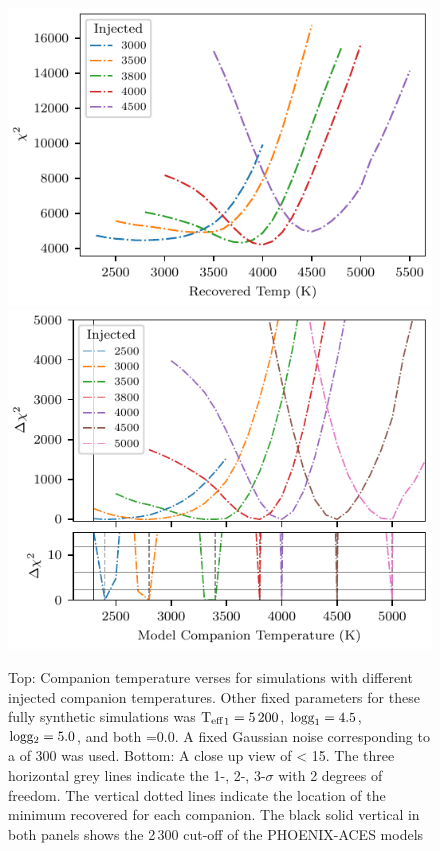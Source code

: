 \begin{figure}
    \centering
    \includegraphics[width=0.7\linewidth]{figures/companion_recovery/chi2_shape_investigation}
    \includegraphics[width=0.7\linewidth]{figures/companion_recovery/chi2_shape_investigation_with_delta}
    \caption{Top: Companion temperature verses \textchisquared{} for simulations with different injected companion temperatures.
    Other fixed parameters for these fully synthetic simulations was \({\textrm{T}_{\mathrm{eff}}}_{1}=5\,200\)\K{}, \(\textrm{logg}_1=4.5\), \(\textrm{logg}{}_2=5.0\), and both \feh{}=0.0.
    A fixed Gaussian noise corresponding to a \snr{} of 300 was used.
    Bottom: A close up view of \textchisquared{} < 15.
    The three horizontal grey lines indicate the 1-, 2-, 3-$\sigma$ with 2 degrees of freedom.
    The vertical dotted lines indicate the location of the minimum \textchisquared{} recovered for each companion.
    The black solid vertical in both panels shows the 2\,300\K{} cut-off of the {PHOENIX-ACES} models}
    \label{fig:injection_shape}
\end{figure}




